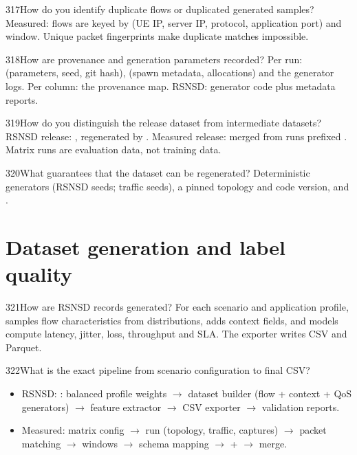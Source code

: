 \begin{qa}{317}{How do you identify duplicate flows or duplicated generated samples?}
Measured: flows are keyed by (UE IP, server IP, protocol, application port) and window. Unique packet fingerprints
make duplicate matches impossible.
\end{qa}

\begin{qa}{318}{How are provenance and generation parameters recorded?}
Per run:  (parameters, seed, git hash),  (spawn metadata, allocations) and the
generator logs. Per column: the provenance map. RSNSD: generator code plus metadata reports.
\end{qa}

\begin{qa}{319}{How do you distinguish the release dataset from intermediate datasets?}
RSNSD release: , regenerated by . Measured release:
 merged from runs prefixed . Matrix runs are
evaluation data, not training data.
\end{qa}

\begin{qa}{320}{What guarantees that the dataset can be regenerated?}
Deterministic generators (RSNSD seeds; traffic seeds), a pinned topology and code version, and
.
\end{qa}

\section{Dataset generation and label quality}

\begin{qa}{321}{How are RSNSD records generated?}
For each scenario and application profile,  samples flow characteristics from
distributions,  adds context fields, and  models compute latency, jitter, loss,
throughput and SLA. The exporter writes CSV and Parquet.
\end{qa}

\begin{qa}{322}{What is the exact pipeline from scenario configuration to final CSV?}
\begin{itemize}
\item RSNSD: : balanced profile weights $\rightarrow$ dataset builder (flow + context + QoS
generators) $\rightarrow$ feature extractor $\rightarrow$ CSV exporter $\rightarrow$ validation reports.
\item Measured: matrix config $\rightarrow$ run (topology, traffic, captures) $\rightarrow$ packet matching
$\rightarrow$ windows $\rightarrow$ schema mapping $\rightarrow$  + 
$\rightarrow$ merge.
\end{itemize}
\end{qa}

